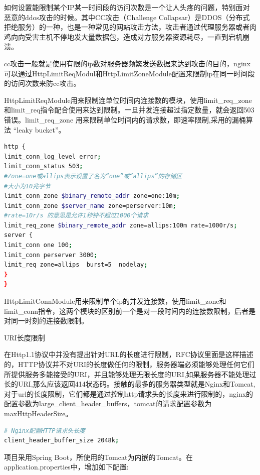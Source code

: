 \documentclass[11pt,fleqn]{book}
\makeatletter
\numberwithin{dummy}{section}
\theoremstyle{ocrenumbox}
\theoremstyle{blacknumex}
\theoremstyle{blacknumbox}
\theoremstyle{ocrenum}
\renewcommand{\subsection}{\@startsection {subsection}{2}{\z@}
	{-3ex \@plus -0.1ex \@minus -.4ex}
	{0.5ex \@plus.2ex }
	{\normalfont\sffamily\bfseries}}
\makeatother
\begin{document}
如何设置能限制某个IP某一时间段的访问次数是一个让人头疼的问题，特别面对恶意的ddos攻击的时候。其中CC攻击（Challenge Collapsar）是DDOS（分布式拒绝服务）的一种，也是一种常见的网站攻击方法，攻击者通过代理服务器或者肉鸡向向受害主机不停地发大量数据包，造成对方服务器资源耗尽，一直到宕机崩溃。

cc攻击一般就是使用有限的ip数对服务器频繁发送数据来达到攻击的目的，nginx可以通过HttpLimitReqModul和HttpLimitZoneModule配置来限制ip在同一时间段的访问次数来防cc攻击。

HttpLimitReqModule用来限制连单位时间内连接数的模块，使用limit\_req\_zone和limit\_req指令配合使用来达到限制。一旦并发连接超过指定数量，就会返回503错误。limit\_req\_zone 用来限制单位时间内的请求数，即速率限制,采用的漏桶算法 “leaky bucket”。

\begin{lstlisting}[language=bash]
http {
limit_conn_log_level error;
limit_conn_status 503;
#Zone=one或allips表示设置了名为“one”或“allips”的存储区
#大小为10兆字节
limit_conn_zone $binary_remote_addr zone=one:10m;
limit_conn_zone $server_name zone=perserver:10m;
#rate=10r/s 的意思是允许1秒钟不超过1000个请求
limit_req_zone $binary_remote_addr zone=allips:100m rate=1000r/s;  
server {
limit_conn one 100;
limit_conn perserver 3000;
limit_req zone=allips  burst=5  nodelay;
}
}
\end{lstlisting}

HttpLimitConnModule用来限制单个ip的并发连接数，使用limit\_zone和limit\_conn指令，这两个模块的区别前一个是对一段时间内的连接数限制，后者是对同一时刻的连接数限制。

\subsection{URI长度限制}

在Http1.1协议中并没有提出针对URL的长度进行限制，RFC协议里面是这样描述的，HTTP协议并不对URI的长度做任何的限制，服务器端必须能够处理任何它们所提供服务多能接受的URI，并且能够处理无限长度的URI,如果服务器不能处理过长的URI,那么应该返回414状态码。接触的最多的服务器类型就是Nginx和Tomcat,对于url的长度限制，它们都是通过控制http请求头的长度来进行限制的，nginx的配置参数为large\_client\_header\_buffers，tomcat的请求配置参数为maxHttpHeaderSize。

\begin{lstlisting}[language=bash]
# Nginx配置HTTP请求头长度
client_header_buffer_size 2048k;
\end{lstlisting}

项目采用Spring Boot，所使用的Tomcat为内嵌的Tomcat。在application.properties中，增加如下配置:
\end{document}
